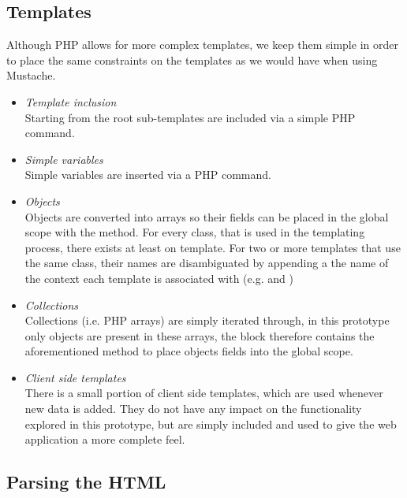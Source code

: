 \subsection{Templates}
Although PHP allows for more complex templates, we keep them simple in order to
place the same constraints on the templates as we would have when using
Mustache.
\begin{itemize}
	\item \emph{Template inclusion}\\
	Starting from the root sub-templates are included via a simple
	PHP  command.
	\item \emph{Simple variables}\\
	Simple variables are inserted via a PHP  command.
	\item \emph{Objects}\\
	Objects are converted into arrays so their fields can be placed in the global
	scope with the  method. For every class, that is used in the
	templating process, there exists at least on template. For two or more
	templates that use the same class, their names are disambiguated by appending
	a the name of the context each template is associated with (e.g.
	 and )
	\item \emph{Collections}\\
	Collections (i.e. PHP arrays) are simply iterated through, in this prototype
	only objects are present in these arrays, the  block therefore
	contains the aforementioned method to place objects fields into the global
	scope.
	\item \emph{Client side templates}\\
	There is a small portion of client side templates, which are used whenever new
	data is added.  They do not have any impact on the functionality explored in
	this prototype, but are simply included and used to give the web application a
	more complete feel.
\end{itemize}
\subsection{Parsing the HTML}
